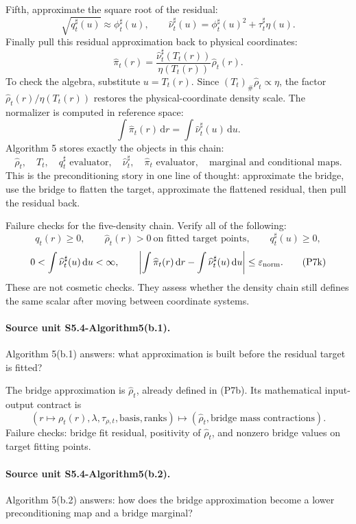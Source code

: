\documentclass[11pt]{article}
\newcommand{\dd}{\,\mathrm d}
\begin{document}
Fifth, approximate the square root of the residual:
\[
    \sqrt{q_t^\sharp(u)}\approx \phi_t^\sharp(u),
    \qquad
    \widehat\nu_t^\sharp(u)
    =
    \phi_t^\sharp(u)^2+\tau_t^\sharp\eta(u).
    \tag{P7f}
\]
Finally pull this residual approximation back to physical coordinates:
\[
    \widehat\pi_t(r)
    =
    \frac{\widehat\nu_t^\sharp(T_t(r))}
    {\eta(T_t(r))}
    \widehat\rho_t(r).
    \tag{P7g}
\]
To check the algebra, substitute \(u=T_t(r)\).  Since
\((T_t)_\#\widehat\rho_t\propto\eta\), the factor
\(\widehat\rho_t(r)/\eta(T_t(r))\) restores the physical-coordinate density
scale.  The normalizer is computed in reference space:
\[
    \int \widehat\pi_t(r)\dd r
    =
    \int \widehat\nu_t^\sharp(u)\dd u.
    \tag{P7h}
\]
Algorithm 5 stores exactly the objects in this chain:
\[
    \widehat\rho_t,\quad T_t,\quad q_t^\sharp\text{ evaluator},\quad
    \widehat\nu_t^\sharp,\quad \widehat\pi_t\text{ evaluator},\quad
    \text{marginal and conditional maps}.
    \tag{P7i}
\]
This is the preconditioning story in one line of thought: approximate the
bridge, use the bridge to flatten the target, approximate the flattened
residual, then pull the residual back.

Failure checks for the five-density chain.  Verify all of the following:
\[
    q_t(r)\ge0,\qquad
    \widehat\rho_t(r)>0\ \text{on fitted target points},\qquad
    q_t^\sharp(u)\ge0,
    \tag{P7j}
\]
\[
    0<\int\widehat\nu_t^\sharp(u)\dd u<\infty,\qquad
    \left|
    \int\widehat\pi_t(r)\dd r-\int\widehat\nu_t^\sharp(u)\dd u
    \right|
    \le \varepsilon_{\rm norm}.
    \tag{P7k}
\]
These are not cosmetic checks.  They assess whether the density chain still
defines the same scalar after moving between coordinate systems.

\paragraph{Source unit S5.4-Algorithm5(b.1).}
Algorithm 5(b.1) answers: what approximation is built before the residual
target is fitted?

The bridge approximation is \(\widehat\rho_t\), already defined in (P7b).  Its
mathematical input-output contract is
\[
    (r\mapsto \rho_t(r),\lambda,\tau_{\rho,t},\text{basis},\text{ranks})
    \mapsto
    (\widehat\rho_t,\text{bridge mass contractions}).
    \tag{P7l}
\]
Failure checks: bridge fit residual, positivity of \(\widehat\rho_t\), and
nonzero bridge values on target fitting points.

\paragraph{Source unit S5.4-Algorithm5(b.2).}
Algorithm 5(b.2) answers: how does the bridge approximation become a lower
preconditioning map and a bridge marginal?
\end{document}
